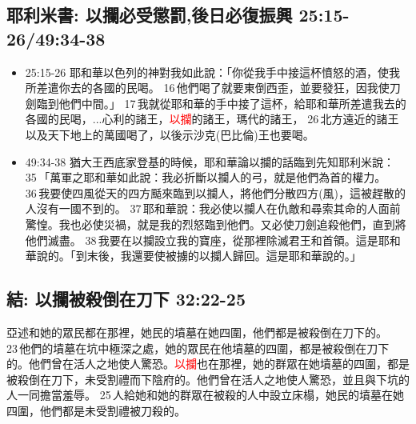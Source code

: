 \subsection{耶利米書: 以攔必受懲罰,後日必復振興 25:15-26/49:34-38}
\begin{itemize}
\item 25:15-26 耶和華以色列的神對我如此說：「你從我手中接這杯憤怒的酒，使我所差遣你去的各國的民喝。 16 他們喝了就要東倒西歪，並要發狂，因我使刀劍臨到他們中間。」 17 我就從耶和華的手中接了這杯，給耶和華所差遣我去的各國的民喝，...心利的諸王，\textcolor{red}{以攔}的諸王，瑪代的諸王， 26 北方遠近的諸王以及天下地上的萬國喝了，以後示沙克(巴比倫)王也要喝。
\item 49:34-38 猶大王西底家登基的時候，耶和華論以攔的話臨到先知耶利米說： 35 「萬軍之耶和華如此說：我必折斷以攔人的弓，就是他們為首的權力。 36 我要使四風從天的四方颳來臨到以攔人，將他們分散四方(風)，這被趕散的人沒有一國不到的。 37 耶和華說：我必使以攔人在仇敵和尋索其命的人面前驚惶。我也必使災禍，就是我的烈怒臨到他們。又必使刀劍追殺他們，直到將他們滅盡。 38 我要在以攔設立我的寶座，從那裡除滅君王和首領。這是耶和華說的。「到末後，我還要使被擄的以攔人歸回。這是耶和華說的。」
\end{itemize}

\subsection{結: 以攔被殺倒在刀下 32:22-25}
亞述和她的眾民都在那裡，她民的墳墓在她四圍，他們都是被殺倒在刀下的。 23 他們的墳墓在坑中極深之處，她的眾民在他墳墓的四圍，都是被殺倒在刀下的。他們曾在活人之地使人驚恐。\textcolor{red}{以攔}也在那裡，她的群眾在她墳墓的四圍，都是被殺倒在刀下，未受割禮而下陰府的。他們曾在活人之地使人驚恐，並且與下坑的人一同擔當羞辱。 25 人給她和她的群眾在被殺的人中設立床榻，她民的墳墓在她四圍，他們都是未受割禮被刀殺的。


